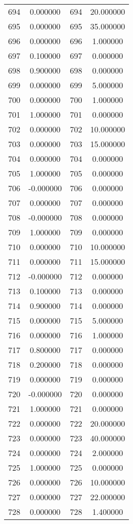 \documentclass[12pt]{article}
\begin{document}
\begin{longtable}{@{}cccc@{}}
694 & 0.000000 & 694 & 20.000000 \\
695 & 0.000000 & 695 & 35.000000 \\
696 & 0.000000 & 696 & 1.000000 \\
697 & 0.100000 & 697 & 0.000000 \\
698 & 0.900000 & 698 & 0.000000 \\
699 & 0.000000 & 699 & 5.000000 \\
700 & 0.000000 & 700 & 1.000000 \\
701 & 1.000000 & 701 & 0.000000 \\
702 & 0.000000 & 702 & 10.000000 \\
703 & 0.000000 & 703 & 15.000000 \\
704 & 0.000000 & 704 & 0.000000 \\
705 & 1.000000 & 705 & 0.000000 \\
706 & -0.000000 & 706 & 0.000000 \\
707 & 0.000000 & 707 & 0.000000 \\
708 & -0.000000 & 708 & 0.000000 \\
709 & 1.000000 & 709 & 0.000000 \\
710 & 0.000000 & 710 & 10.000000 \\
711 & 0.000000 & 711 & 15.000000 \\
712 & -0.000000 & 712 & 0.000000 \\
713 & 0.100000 & 713 & 0.000000 \\
714 & 0.900000 & 714 & 0.000000 \\
715 & 0.000000 & 715 & 5.000000 \\
716 & 0.000000 & 716 & 1.000000 \\
717 & 0.800000 & 717 & 0.000000 \\
718 & 0.200000 & 718 & 0.000000 \\
719 & 0.000000 & 719 & 0.000000 \\
720 & -0.000000 & 720 & 0.000000 \\
721 & 1.000000 & 721 & 0.000000 \\
722 & 0.000000 & 722 & 20.000000 \\
723 & 0.000000 & 723 & 40.000000 \\
724 & 0.000000 & 724 & 2.000000 \\
725 & 1.000000 & 725 & 0.000000 \\
726 & 0.000000 & 726 & 10.000000 \\
727 & 0.000000 & 727 & 22.000000 \\
728 & 0.000000 & 728 & 1.400000 \\

\end{longtable}
\end{document}

